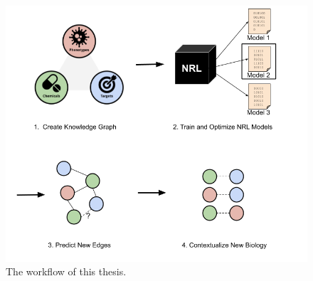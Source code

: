 \begin{figure}[!ht]
    \centering
    \includegraphics[scale=0.60]
    {figures/workflow.png}
    \caption{\label{fig:workflow} The workflow of this thesis.}
\end{figure}
